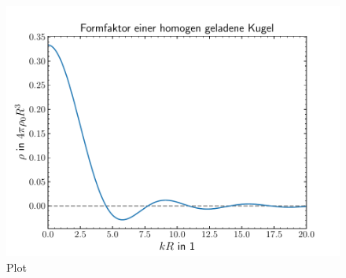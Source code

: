 \documentclass[exa]{exercise_5.0}
\begin{document}
\begin{figure}[H]
    \centering
    \includegraphics[width=1.0\textwidth]{formfaktor.pdf}
    \caption{Plot}
\end{figure}


\end{document}
